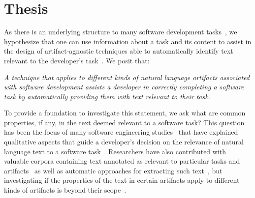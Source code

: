 

\section{Thesis}
\label{cp1:thesis}





As there is an underlying structure to many software development tasks~\cite{Murphy2005},
we hypothesize that one can use information about a task and its content to assist in 
the design of artifact-agnostic techniques able to  
automatically identify text relevant to the developer's task~\cite{Starke2009, Bavota2016}. We posit that:


\medskip
\begin{bluequote}
    \textit{A technique that applies to different kinds of natural language artifacts associated with software development assists a developer in correctly completing a software task by 
    automatically providing them with text relevant to their task.  }
\end{bluequote}



To provide a foundation to investigate this statement, we ask what are common properties, if any, in the text deemed relevant to a software task? This question has been the focus of many software engineering studies~\cite{Piorkowski2015, Piorkowski2016, chi2007, Ko2006a} that have explained qualitative aspects that 
guide a developer's decision on the relevance of natural language text 
to a software task~\cite{Forward2002, BenCharrada2016, Starke2009, DeGraaf2014}.
Researchers have also contributed with valuable corpora
containing text annotated as relevant to particular tasks and artifacts~\cite{nadi2019Rep, Rastkar2010}
as well as automatic approaches for extracting such text~\cite{Chaparro2017, Robillard2015, Xu2017}, 
but investigating if  the properties 
of the text in certain artifacts apply to different kinds of artifacts
is beyond their scope~\cite{hutchinson2021, bird2009}.




